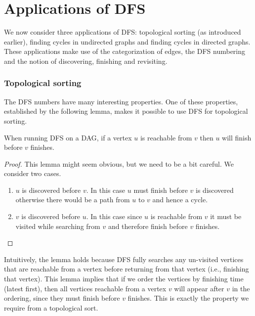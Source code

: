 \section{Applications of DFS}

We now consider three applications of DFS: topological sorting (as
introduced earlier), finding cycles in undirected graphs and finding
cycles in directed graphs.    These applications make use of
the categorization of edges, the DFS numbering and the notion
of discovering, finishing and revisiting.


\subsubsection{Topological sorting}

The DFS numbers have many interesting properties.  One of these
properties, established by the following lemma, makes it possible to
use DFS for topological sorting.


\begin{lemma}
  When running DFS on a DAG, if a vertex $u$ is reachable from $v$
  then $u$ will finish before $v$ finishes.
\begin{proof}
  This lemma might seem obvious, but we need to be a bit careful.
  We consider two cases.
\begin{enumerate}
\item $u$ is discovered before $v$.   In this case $u$ must
finish before $v$ is discovered otherwise there would be a
path from $u$ to $v$ and hence a cycle.
\item $v$ is discovered before $u$.  In this case since $u$ is
  reachable from $v$ it must be visited while searching from $v$ and
  therefore finish before $v$ finishes.
\end{enumerate}
\vspace{-.3in}
\end{proof}
\end{lemma}


Intuitively, the lemma holds because DFS fully searches any un-visited
vertices that are reachable from a vertex before returning from that
vertex (i.e., finishing that vertex). 
%
This lemma implies that if we order the vertices by finishing time
(latest first), then all vertices reachable from a vertex $v$ will
appear after $v$ in the ordering, since they must finish before $v$
finishes.  This is exactly the property we require from a topological
sort.

